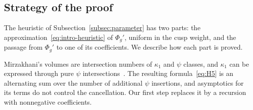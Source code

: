 \subsection{Strategy of the proof}\label{subsec:strategy}
The heuristic of Subsection~\ref{subsec:parameter} has two parts: the approximation~\eqref{eq:intro-heuristic} of $\Phi_g'$, uniform in the cusp weight, and the passage from $\Phi_g'$ to one of its coefficients. We describe how each part is proved.

Mirzakhani's volumes are intersection numbers of $\kappa_1$ and $\psi$ classes, and $\kappa_1$ can be expressed through pure $\psi$ intersections~\cite{KMZ,ManZ}. The resulting formula~\eqref{eq:H5} is an alternating sum over the number of additional $\psi$ insertions, and asymptotics for its terms do not control the cancellation. Our first step replaces it by a recursion with nonnegative coefficients.

